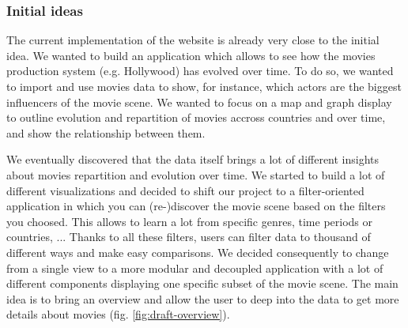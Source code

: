 \documentclass[a4paper,10pt]{article}
\begin{document}
\subsubsection{Initial ideas}

The current implementation of the website is already very close to the initial idea.
We wanted to build an application which allows to see how the movies production
system (e.g. Hollywood) has evolved over time. To do so, we wanted to import and
use movies data to show, for instance, which actors are the biggest influencers of
the movie scene. We wanted to focus on a map and graph display to outline evolution
and repartition of movies accross countries and over time, and show the relationship between
them.

We eventually discovered that the data itself brings a lot of different insights
about movies repartition and evolution over time. We started to build a lot of different
visualizations and decided to shift our project to a filter-oriented application
in which you can (re-)discover the movie scene based on the filters you choosed.
This allows to learn a lot from specific genres, time periods or countries, ...
Thanks to all these filters, users can filter data to thousand of different
ways and make easy comparisons. We decided consequently to change from a single
view to a more modular and decoupled application with a lot of different components
displaying one specific subset of the movie scene. The main idea is to bring an
overview and allow the user to deep into the data to get more details about movies (fig. \ref{fig:draft-overview}).
\end{document}
